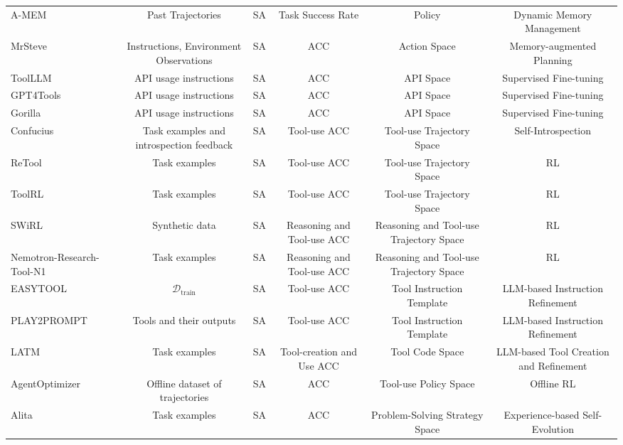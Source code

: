 \begin{table}[t]
{\begin{tabular}{lccccc}
        A-MEM~\citep{xu2025amemagenticmemoryllm} & Past Trajectories & SA & Task Success Rate & Policy & Dynamic Memory Management \\

        MrSteve~\citep{park2025mrsteveinstructionfollowingagentsminecraft} & Instructions, Environment Observations & SA & ACC & Action Space & Memory-augmented Planning \\

        ToolLLM~\citep{qin2024toolllm} & API usage instructions & SA & ACC & API Space & Supervised Fine-tuning \\

        GPT4Tools~\citep{yang2023gpt4tools} & API usage instructions & SA & ACC & API Space & Supervised Fine-tuning \\

        Gorilla~\citep{patil2024gorilla} & API usage instructions & SA & ACC & API Space & Supervised Fine-tuning \\
        Confucius~\citep{gao2024confucius} & Task examples and introspection feedback & SA & Tool-use ACC & Tool-use Trajectory Space & Self-Introspection\\
        ReTool~\citep{feng2025retool} & Task examples & SA & Tool-use ACC & Tool-use Trajectory Space & RL\\
        ToolRL~\citep{qian2025toolrl} & Task examples & SA & Tool-use ACC & Tool-use Trajectory Space & RL\\
        SWiRL~\citep{goldie2025synthetic} & Synthetic data & SA & Reasoning and Tool-use ACC & Reasoning and Tool-use Trajectory Space & RL\\
        Nemotron-Research-Tool-N1~\citep{zhang2025nemotron} & Task examples& SA & Reasoning and Tool-use ACC & Reasoning and Tool-use Trajectory Space & RL\\
        EASYTOOL~\citep{yuan-etal-2025-easytool} & $\mathcal{D}_{\text{train}}$ & SA & Tool-use ACC & Tool Instruction Template & LLM-based Instruction Refinement\\
        PLAY2PROMPT~\citep{fang2025play2prompt} & Tools and their outputs & SA & Tool-use ACC & Tool Instruction Template & LLM-based Instruction Refinement\\
        LATM~\citep{cai2024large} & Task examples & SA & Tool-creation and Use ACC & Tool Code Space & LLM-based Tool Creation and Refinement\\
        AgentOptimizer~\citep{zhang2024offline} & Offline dataset of trajectories & SA & ACC & Tool-use Policy Space & Offline RL\\
        Alita~\citep{qiu2025alita} & Task examples & SA & ACC & Problem-Solving Strategy Space & Experience-based Self-Evolution\\



\end{tabular}}
\end{table}
